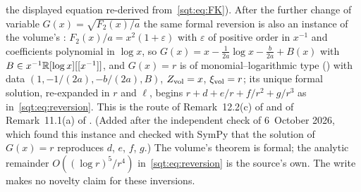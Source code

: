 \begin{remark}
the displayed equation re-derived from~\eqref{sqt:eq:FK}). After the
further change of variable $G(x)=\sqrt{F_2(x)/a}$ the same formal reversion
is also an instance of the volume's :
$F_2(x)/a=x^2(1+\varepsilon)$ with $\varepsilon$ of positive order in
$x^{-1}$ and coefficients polynomial in $\log x$, so
$G(x)=x-\frac1{2a}\log x-\frac b{2a}+B(x)$ with
$B\in x^{-1}\mathbb R[\log x][[x^{-1}]]$, and $G(x)=r$ is of
monomial--logarithmic type () with data
$(1,-1/(2a),-b/(2a),B)$, $Z_{\rm vol}=x$, $\xi_{\rm vol}=r$; its unique
formal solution, re-expanded in $r$ and $\ell$, begins
$r+d+e/r+f/r^2+g/r^3$ as in~\eqref{sqt:eq:reversion}. This is the route of
Remark~12.2(c) of  and of
Remark~11.1(a) of . \textup{(Added after
the independent check of 6~October 2026, which found this instance and
checked with SymPy that the solution of $G(x)=r$ reproduces $d$, $e$, $f$,
$g$.)} The volume's
theorem is formal; the analytic remainder
$O((\log r)^5/r^4)$ in~\eqref{sqt:eq:reversion} is the source's own. The
write makes no novelty claim for these inversions.
\end{remark}
